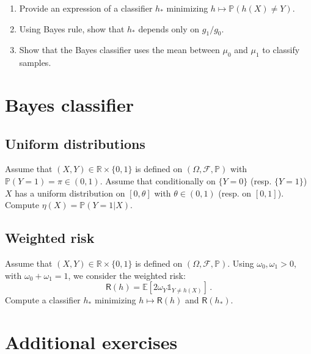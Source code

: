 \documentclass[a4paper,10pt,fleqn]{article}
\newcommand{\bP}{\mathbb{P}}
\newcommand{\1}{\ensuremath{\mathbbm{1}}}
\newcommand{\bE}{\mathbb{E}}
\begin{document}
\begin{enumerate}
\item Provide an expression of a classifier $h_*$ minimizing $h \mapsto \bP(h(X)\neq Y)$.

\item Using Bayes rule, show that  $h_*$ depends only on $g_1/g_0$.

\item Show that the Bayes classifier uses the mean between  $\mu_0$ and  $\mu_1$ to classify samples.

\end{enumerate}



\section{Bayes classifier}
\subsection{Uniform distributions}
Assume that $(X,Y)\in\mathbb{R}\times\{0,1\}$ is defined on $(\Omega,\mathcal{F},\mathbb{P})$ with $\mathbb{P}(Y=1) = \pi \in(0,1)$.  Assume that conditionally on $\{Y=0\}$ (resp. $\{Y=1\}$) $X$ has a uniform distribution on $[0,\theta]$ with $\theta\in(0,1)$ (resp. on $[0,1]$). Compute $\eta(X) = \mathbb{P}(Y=1 |X)$.

\subsection{Weighted risk}
Assume that $(X,Y)\in\mathbb{R}\times\{0,1\}$ is defined on $(\Omega,\mathcal{F},\mathbb{P})$. Using $\omega_0, \omega_1 >0$, with $\omega_0+\omega_1 = 1$, we  consider the weighted risk:
$$
\mathsf{R}(h) = \bE[2\omega_Y \mathds{1}_{Y\neq h(X)}]\,.
$$
Compute a classifier $h_*$ minimizing $h\mapsto \mathsf{R}(h)$ and $\mathsf{R}(h_*)$.


\section{Additional exercises}
\end{document}
